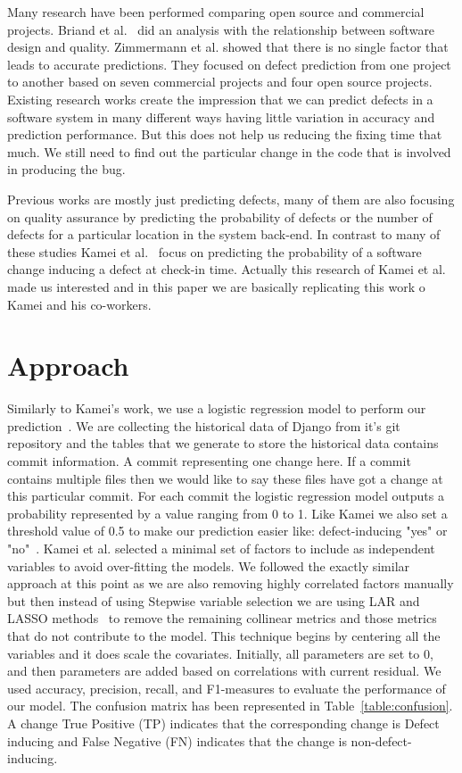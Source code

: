 \documentclass[10pt, conference]{IEEEtran}
\begin{document}
Many research have been performed comparing open source and commercial projects. Briand et al.~\cite{Briand1999ICSE} did an analysis with the relationship between software design and quality. Zimmermann et al.\cite{Zimmermann2009ESECS} showed that there is no single factor that leads to accurate predictions. They focused on defect prediction from one project to another based on seven commercial projects and four open source projects. Existing research works create the impression that we can predict defects in a software system in many different ways having little variation in accuracy and prediction performance. But this does not help us reducing the fixing time that much. We still need to find out the particular change in the code that is involved in producing the bug.

Previous works are mostly just predicting defects, many of them are also focusing on quality assurance by predicting the probability of defects or the number of defects for a particular location in the system back-end. In contrast to many of these studies Kamei et al.~\cite{Kamei2013TSE} focus on predicting the probability of a software change inducing a defect at check-in time. Actually this research of Kamei et al. made us interested and in this paper we are basically replicating this work o Kamei and his co-workers.

\section{Approach}
\label{sec:approach}
Similarly to Kamei's work, we use a logistic regression model to perform our prediction~\cite{Kamei2013TSE}. We are collecting the historical data of Django from it's git repository and the tables that we generate to store the historical data contains commit information. A commit representing one change here. If a commit contains multiple files then we would like to say these files have got a change at this particular commit. For each commit the logistic regression model outputs a probability represented by a value ranging from 0 to 1. Like Kamei we also set a threshold value of 0.5 to make our prediction easier like: defect-inducing "yes" or "no"~\cite{Gyimothy2005TSE,Guo2010ICSE}.
Kamei et al. selected a minimal set of factors to include as independent variables to avoid over-fitting the models. We followed the exactly similar approach at this point as we are also removing highly correlated factors manually but then instead of using Stepwise variable selection we are using LAR and LASSO methods~\cite{Flom2007NESUG} to remove the remaining collinear metrics and those metrics that do not contribute to the model. This technique begins by centering all the variables and it does scale the covariates. Initially, all parameters are set to 0, and then parameters are added based on correlations with current residual. 
We used accuracy, precision, recall, and F1-measures to evaluate the performance of our model. The confusion matrix has been represented in Table~\ref{table:confusion}. A change True Positive (TP) indicates that the corresponding change is Defect inducing and False Negative (FN) indicates that the change is non-defect-inducing.
\end{document}
